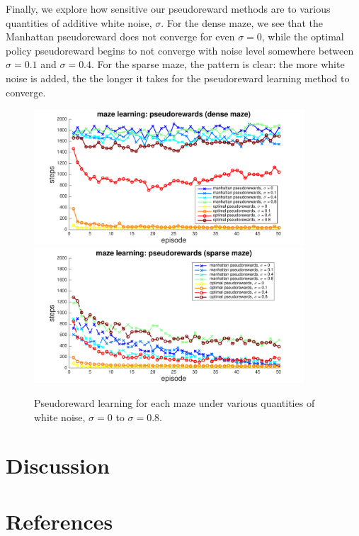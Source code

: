 \documentclass[notitlepage]{article}
\begin{document}
Finally, we explore how sensitive our pseudoreward methods are to various quantities of additive white noise, $\sigma$. For the dense maze, we see that the Manhattan pseudoreward does not converge for even $\sigma = 0$, while the optimal policy pseudoreward begins to not converge with noise level somewhere between $\sigma = 0.1$ and $\sigma = 0.4$. For the sparse maze, the pattern is clear: the more white noise is added, the the longer it takes for the pseudoreward learning method to converge.

\begin{figure}[ht]
\includegraphics[width=0.9\textwidth]{PRdenseCompare}
\includegraphics[width=0.9\textwidth]{PRsparseCompare}
\caption{Pseudoreward learning for each maze under various quantities of white noise, $\sigma = 0$ to $\sigma = 0.8$.}
\label{fig:sigma-compare}
\end{figure}

\section*{Discussion}

\section*{References}

{}

\end{document}
